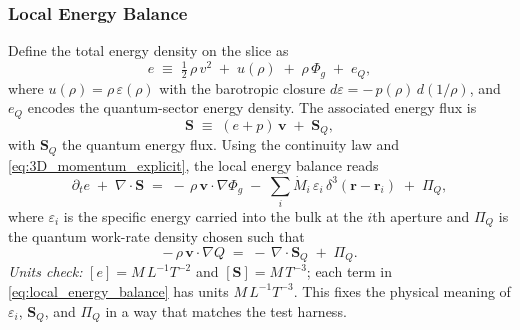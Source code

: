 \subsubsection{Local Energy Balance}
Define the total energy density on the slice as
\begin{equation}
e \;\equiv\; \tfrac12\,\rho\,v^2 \;+\; u(\rho) \;+\; \rho\,\Phi_g \;+\; e_Q,
\label{eq:energy_density_def}
\end{equation}
where $u(\rho)=\rho\,\varepsilon(\rho)$ with the barotropic closure $d\varepsilon = -\,p(\rho)\,d(1/\rho)$, and $e_Q$ encodes the quantum-sector energy density. The associated energy flux is
\begin{equation}
\mathbf S \;\equiv\; (e+p)\,\mathbf v \;+\; \mathbf S_Q,
\label{eq:energy_flux_def}
\end{equation}
with $\mathbf S_Q$ the quantum energy flux. Using the continuity law and \eqref{eq:3D_momentum_explicit}, the local energy balance reads
\begin{equation}
\partial_t e \;+\; \nabla\!\cdot \mathbf S
\;=\; -\,\rho\,\mathbf v\!\cdot\nabla \Phi_g \;-\; \sum_i \dot M_i\,\varepsilon_i\,\delta^3(\mathbf r-\mathbf r_i)\;+\; \Pi_Q,
\label{eq:local_energy_balance}
\end{equation}
where $\varepsilon_i$ is the specific energy carried into the bulk at the $i$th aperture and $\Pi_Q$ is the quantum work-rate density chosen such that
\begin{equation}
-\,\rho\,\mathbf v\!\cdot\nabla Q \;=\; -\,\nabla\!\cdot \mathbf S_Q \;+\; \Pi_Q.
\label{eq:quantum_power_identity}
\end{equation}
\emph{Units check:} $[e]=M\,L^{-1}T^{-2}$ and $[\mathbf S]=M\,T^{-3}$; each term in \eqref{eq:local_energy_balance} has units $M\,L^{-1}T^{-3}$. This fixes the physical meaning of $\varepsilon_i$, $\mathbf S_Q$, and $\Pi_Q$ in a way that matches the test harness.

